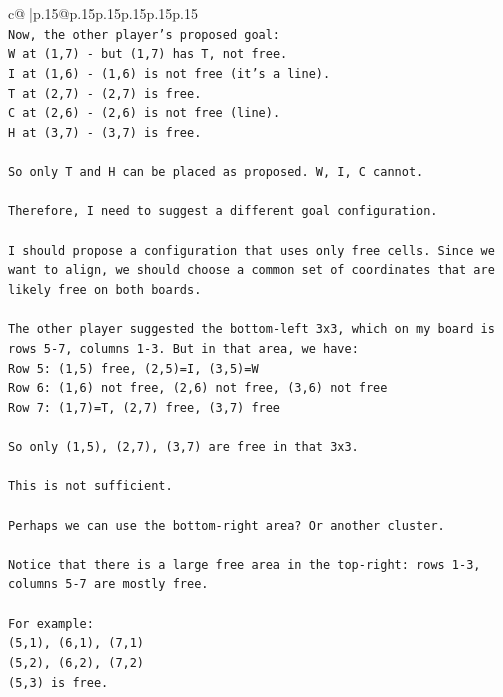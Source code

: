 \documentclass{article}
\begin{document}
{\begin{supertabular}{c@{$\;$}|p{.15\linewidth}@{}p{.15\linewidth}p{.15\linewidth}p{.15\linewidth}p{.15\linewidth}p{.15\linewidth}}
{{{\\ 
\texttt{Now, the other player's proposed goal:} \\
\texttt{W at (1,7) {-} but (1,7) has T, not free.} \\
\texttt{I at (1,6) {-} (1,6) is not free (it's a line).} \\
\texttt{T at (2,7) {-} (2,7) is free.} \\
\texttt{C at (2,6) {-} (2,6) is not free (line).} \\
\texttt{H at (3,7) {-} (3,7) is free.} \\
\\ 
\texttt{So only T and H can be placed as proposed. W, I, C cannot.} \\
\\ 
\texttt{Therefore, I need to suggest a different goal configuration.} \\
\\ 
\texttt{I should propose a configuration that uses only free cells. Since we want to align, we should choose a common set of coordinates that are likely free on both boards.} \\
\\ 
\texttt{The other player suggested the bottom{-}left 3x3, which on my board is rows 5{-}7, columns 1{-}3. But in that area, we have:} \\
\texttt{Row 5: (1,5) free, (2,5)=I, (3,5)=W} \\
\texttt{Row 6: (1,6) not free, (2,6) not free, (3,6) not free} \\
\texttt{Row 7: (1,7)=T, (2,7) free, (3,7) free} \\
\\ 
\texttt{So only (1,5), (2,7), (3,7) are free in that 3x3.} \\
\\ 
\texttt{This is not sufficient.} \\
\\ 
\texttt{Perhaps we can use the bottom{-}right area? Or another cluster.} \\
\\ 
\texttt{Notice that there is a large free area in the top{-}right: rows 1{-}3, columns 5{-}7 are mostly free.} \\
\\ 
\texttt{For example:} \\
\texttt{(5,1), (6,1), (7,1)} \\
\texttt{(5,2), (6,2), (7,2)} \\
\texttt{(5,3) is free.} \\
}}}
\end{supertabular}}
\end{document}
